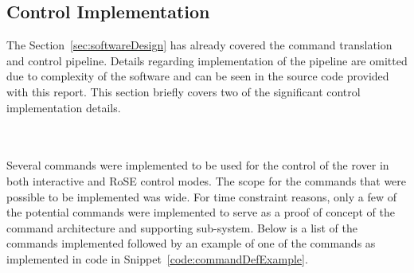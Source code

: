     \subsection{Control Implementation}
      The Section~\ref{sec:softwareDesign} has already covered the command translation and control pipeline. Details regarding implementation of the pipeline are omitted due to complexity of the software and can be seen in the source code provided with this report. This section briefly covers two of the significant control implementation details.
      
      \\\\
        Several commands were implemented to be used for the control of the rover in both interactive and RoSE control modes. The scope for the commands that were possible to be implemented was wide. For time constraint reasons, only a few of the potential commands were implemented to serve as a proof of concept of the command architecture and supporting sub-system. Below is a list of the commands implemented followed by an example of one of the commands as implemented in code in Snippet~\ref{code:commandDefExample}.
        
